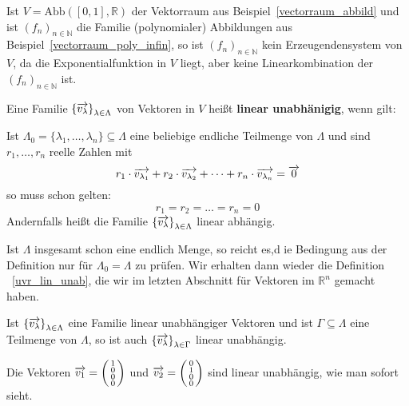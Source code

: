 \begin{beispiel} Ist $V = \textrm{Abb}([0,1], \mathbb R)$ der Vektorraum aus Beispiel~\ref{vectorraum_abbild} 
und ist $\left( f_{n} \right)_{n \in \mathbb N}$
die Familie (polynomialer) Abbildungen aus Beispiel~\ref{vectorraum_poly_infin}, so ist 
$\left( f_{n} \right)_{n \in \mathbb N}$ kein Erzeugendensystem von $V$, da die Exponentialfunktion in $V$ liegt, 
aber keine Linearkombination der $\left( f_{n} \right)_{n \in \mathbb N}$ ist.
\end{beispiel}

\begin{definition}  Eine Familie  $\left\{ \overrightarrow{v_{\lambda}} \right\}_{\lambda \in \Lambda}$ von 
Vektoren in $V$ heißt \textbf{linear 
unabhänigig}, wenn gilt:

Ist $\Lambda_0 = \{\lambda_1, \ldots , \lambda_n \} \subseteq \Lambda$ eine beliebige endliche Teilmenge von 
$\Lambda$ und sind $r_1, \ldots, r_n$ reelle Zahlen mit 
  	$$ r_1 \cdot \overrightarrow{v_{\lambda_1}} + r_2 \cdot \overrightarrow{v_{\lambda_2}} + \cdots 
  	+ r_n \cdot \overrightarrow{v_{\lambda_n}} = \overrightarrow{0} $$
so muss schon gelten:
  	$$ r_1 = r_2 = \ldots = r_n = 0 $$
Andernfalls heißt die Familie $\left\{ \overrightarrow{v_{\lambda}} \right\}_{\lambda \in \Lambda}$ linear 
abhängig.
\end{definition}

\begin{notiz} Ist $\Lambda$ insgesamt schon eine endlich Menge, so reicht es,d ie Bedingung aus der Definition 
nur für $\Lambda_0 = \Lambda$ zu prüfen. Wir erhalten dann wieder die Definition ~\ref{uvr_lin_unab}, die 
wir im letzten Abschnitt für Vektoren im $\mathbb R^n$ gemacht haben.
\end{notiz}

\begin{notiz}\label{lin_un_teil} Ist $\left\{ \overrightarrow{v_{\lambda}} \right\}_{\lambda \in \Lambda}$ eine 
Familie linear unabhängiger Vektoren und ist $\Gamma \subseteq \Lambda$ eine Teilmenge von $\Lambda$, so ist 
auch $\left\{ \overrightarrow{v_{\lambda}} \right\}_{\lambda \in \Gamma}$ linear unabhängig. 
\end{notiz}

\begin{beispiel} Die Vektoren $\overrightarrow{v_1} = \left( \begin{smallmatrix} 1 \\ 0 \\ 0 \\ 0 
\end{smallmatrix} \right)$ und $\overrightarrow{v_2} = \left( \begin{smallmatrix} 0 \\ 1 \\ 0 \\ 0 
\end{smallmatrix} \right)$ sind linear unabhängig, wie man sofort sieht.
\end{beispiel}

